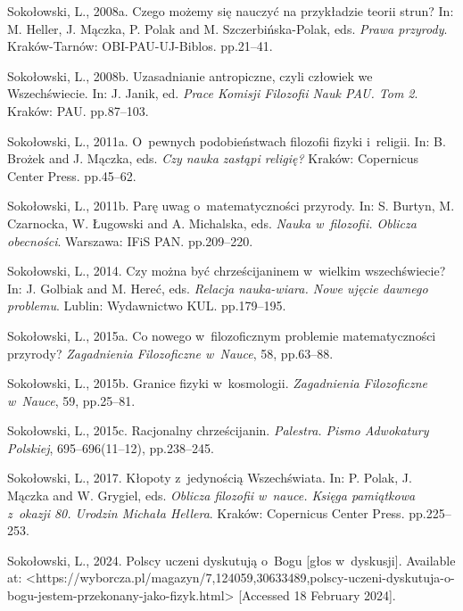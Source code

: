 Sokołowski, L., 2008a. Czego możemy się nauczyć na przykładzie teorii strun? In: M. Heller, J. Mączka, P. Polak and M. Szczerbińska-Polak, eds. \textit{Prawa przyrody}. Kraków-Tarnów: OBI-PAU-UJ-Biblos. pp.21–41.



Sokołowski, L., 2008b. Uzasadnianie antropiczne, czyli człowiek we Wszechświecie. In: J. Janik, ed. \textit{Prace Komisji Filozofii Nauk PAU. Tom 2}. Kraków: PAU. pp.87–103.



Sokołowski, L., 2011a. O~pewnych podobieństwach filozofii fizyki i~religii. In: B. Brożek and J. Mączka, eds. \textit{Czy nauka zastąpi religię?} Kraków: Copernicus Center Press. pp.45–62.



Sokołowski, L., 2011b. Parę uwag o~matematyczności przyrody. In: S. Burtyn, M. Czarnocka, W. Ługowski and A. Michalska, eds. \textit{Nauka w~filozofii. Oblicza obecności}. Warszawa: IFiS PAN. pp.209–220.



Sokołowski, L., 2014. Czy można być chrześcijaninem w~wielkim wszechświecie? In: J. Golbiak and M. Hereć, eds. \textit{Relacja nauka-wiara. Nowe ujęcie dawnego problemu}. Lublin: Wydawnictwo KUL. pp.179–195.



Sokołowski, L., 2015a. Co nowego w~filozoficznym problemie matematyczności przyrody? \textit{Zagadnienia Filozoficzne w~Nauce}, 58, pp.63–88.



Sokołowski, L., 2015b. Granice fizyki w~kosmologii. \textit{Zagadnienia Filozoficzne w~Nauce}, 59, pp.25–81.



Sokołowski, L., 2015c. Racjonalny chrześcijanin. \textit{Palestra. Pismo Adwokatury Polskiej}, 695–696(11–12), pp.238–245.



Sokołowski, L., 2017. Kłopoty z~jedynością Wszechświata. In: P. Polak, J. Mączka and W. Grygiel, eds. \textit{Oblicza filozofii w~nauce. Księga pamiątkowa z~okazji 80. Urodzin Michała Hellera}. Kraków: Copernicus Center Press. pp.225–253.



Sokołowski, L., 2024. Polscy uczeni dyskutują o~Bogu [głos w~dyskusji]. Available at: {\textless}https://wyborcza.pl/magazyn/7,124059,30633489,polscy-uczeni-dyskutuja-o-bogu-jestem-przekonany-jako-fizyk.html{\textgreater} [Accessed 18 February 2024].



